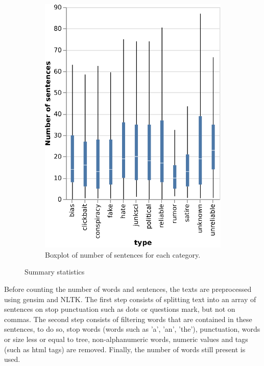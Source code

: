 \begin{figure}[!ht]
\begin{subfigure}[b]{0.4\textwidth}
    \includegraphics{images/data_exploration/boxplot_full_numSentences.eps}
    \caption{Boxplot of number of sentences for each category.}
  \end{subfigure}
  \caption{Summary statistics}
  \label{fig:data_explo:stats1}
\end{figure}
Before counting the number of words and sentences, the texts are preprocessed using gensim\cite{rehurek_lrec} and NLTK\cite{BirdKleinLoper09}. The first step consists of splitting text into an array of sentences on stop punctuation such as dots or questions mark, but not on commas. The second step consists of filtering words that are contained in these sentences, to do so, stop words (words such as 'a', 'an', 'the'), punctuation, words or size less or equal to tree, non-alphanumeric words, numeric values and tags (such as html tags) are removed. Finally, the number of words still present is used. \\

